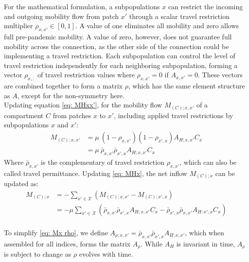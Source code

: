 For the mathematical formulation, a subpopulations $x$ can restrict the incoming and outgoing mobility flow from patch $x'$ through a scalar travel restriction multiplier $\rho_{x,x'} \in [0,1]$. A value of one eliminates all mobility and zero allows full pre-pandemic mobility. A value of zero, however, does not guarantee full mobility across the connection, as the other side of the connection could be implementing a travel restriction. Each subpopulation can control the level of travel restriction independently for each neighboring subpopulation, forming a vector $\rho_{x,:}$ of travel restriction values where $\rho_{x,x'}=0$ if $A_{x,x'}=0$. These vectors are combined together to form a matrix $\rho$, which has the same element structure as $A$, except for the non-symmetry here.\\
Updating equation \ref{eq: MHxx'}, for the mobility flow $M_{(C);x,x'}$ of a compartment $C$ from patches $x$ to $x'$, including applied travel restrictions by subpopulations $x$ and $x'$:
\begin{equation}
\begin{aligned}
    M_{(C);x,x'}    &= \mu \ (1-\rho_{x,x'}) (1-\rho_{x',x}) A_{H;x,x'} C_{x} \\
                    &= \mu \ \bar{\rho}_{x,x'} \bar{\rho}_{x',x} A_{H;x,x'} C_{x}
\end{aligned}
\label{eq: Mxx' rho}
\end{equation}
Where $\bar{\rho}_{x,x'}$ is the complementary of travel restriction $\rho_{x,x'}$, which can also be called travel permittance. Updating \ref{eq: MHx}, the net inflow $M_{(C);x}$ can be updated as:
\begin{equation}
\begin{aligned}
    M_{(C);x} &= -\sum_{x' \in \mathcal{X}} (M_{(C);x,x'} - M_{(C);x',x}) \\
              &= - \mu  \sum_{x' \in \mathcal{X}}\left(\bar{\rho}_{x,x'} \bar{\rho}_{x',x} A_{H;x,x'} C_{x} - \bar{\rho}_{x',x} \bar{\rho}_{x,x'} A_{H;x',x} C_{x} \right) \\
\end{aligned}
\label{eq: Mx rho}
\end{equation}

To simplify \ref{eq: Mx rho}, we define $A_{\rho;x,x'}=\bar{\rho}_{x,x'} \bar{\rho}_{x',x} A_{H;x,x'}$, which when assembled for all indices, forms the matrix $A_\rho$. While $A_H$ is invariant in time, $A_\rho$ is subject to change as $\rho$ evolves with time.

